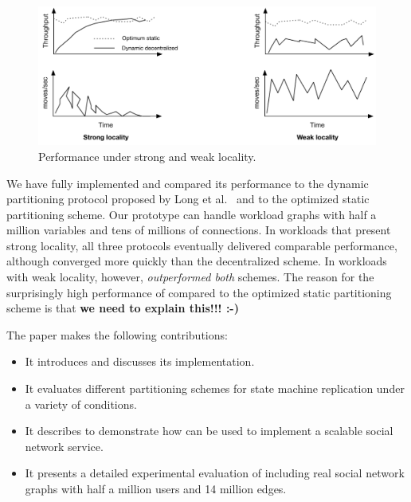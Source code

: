 




\begin{figure}[ht]
	\center
	\includegraphics[width=0.6\linewidth]{figures/motivation}
	\caption{Performance under strong and weak locality.}
	\label{fig:motivation}
\end{figure}



\smallskip


We have fully implemented \dynastar and compared its performance to
the dynamic partitioning protocol proposed by Long et
al.~\cite{hoang2016} and to the optimized static partitioning scheme.
Our prototype can handle workload graphs with half a million variables
and tens of millions of connections.  In workloads that present strong
locality, all three protocols eventually delivered comparable
performance, although \dynastar converged more quickly than the
decentralized scheme.  In workloads with weak locality, however,
\dynastar \emph{outperformed both} schemes.  The reason for the
surprisingly high performance of \dynastar compared to the optimized
static partitioning scheme is that \textbf{we need to explain this!!!
  :-)}

The paper makes the following contributions:
\begin{itemize}
\item It introduces \dynastar and discusses its implementation. 
\item It evaluates different partitioning schemes for state machine replication under a variety of conditions.
\item It describes \appname{} to demonstrate how \libname{} can be used to implement a scalable social network service.
\item It presents a detailed experimental evaluation of \dynastar including real social network graphs with half a million users and 14 million edges.
\end{itemize}

